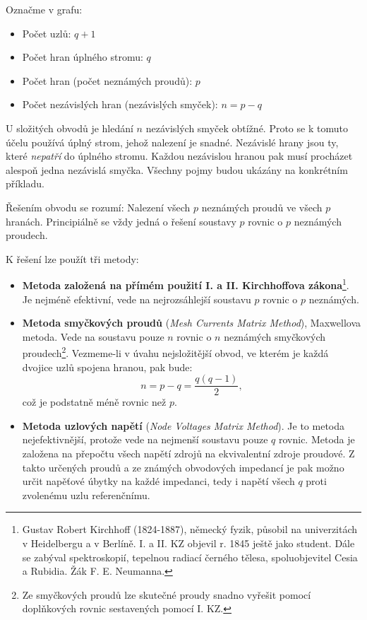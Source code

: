       Označme v grafu:
       \begin{itemize}\addtolength{\itemsep}{-0.5\baselineskip}
         \item Počet uzlů:  \(q +1\)
      \item Počet hran úplného stromu:  \(q\)
      \item Počet hran (počet neznámých proudů):  \(p\)
      \item Počet nezávislých hran (nezávislých smyček):  \(n=p-q\)
      \end{itemize}
      
      U složitých obvodů je hledání \(n\) nezávislých smyček obtížné. Proto se k tomuto účelu 
      používá úplný strom, jehož nalezení je snadné. Nezávislé hrany jsou ty, které \emph{nepatří} 
      do úplného stromu. Každou nezávislou hranou pak musí procházet alespoň jedna nezávislá 
      smyčka. Všechny pojmy budou ukázány na konkrétním příkladu.
      
      Řešením obvodu se rozumí: Nalezení všech \(p\) neznámých proudů ve všech \(p\) hranách.
      Principiálně se vždy jedná o řešení soustavy \(p\) rovnic o \(p\) neznámých proudech.
      
      K řešení lze použít tři metody:
      \begin{itemize}\addtolength{\itemsep}{-0.5\baselineskip}
       \item \textbf{Metoda založená na přímém použití I. a II. Kirchhoffova 
             zákona}\footnote{Gustav Robert Kirchhoff (1824-1887), německý fyzik, působil na 
             univerzitách v Heidelbergu a v Berlíně. I. a II. KZ objevil r. 1845 ještě jako 
             student. Dále se zabýval spektroskopií, tepelnou radiací černého tělesa, 
             spoluobjevitel Cesia a Rubidia. Žák F. E. Neumanna.}.
             Je nejméně efektivní, vede na nejrozsáhlejší soustavu \(p\) rovnic o \(p\) neznámých.
       \item \textbf{Metoda smyčkových proudů} (\emph{Mesh Currents Matrix Method}), Maxwellova 
             metoda. Vede na soustavu pouze \(n\) rovnic o \(n\) neznámých smyčkových 
             proudech\footnote{Ze smyčkových proudů lze skutečné proudy snadno vyřešit pomocí 
             doplňkových rovnic sestavených pomocí I. KZ.}. Vezmeme-li v úvahu nejsložitější obvod, 
             ve kterém je každá dvojice uzlů spojena hranou, pak bude:
             \begin{equation}\label{ES:eq_topol00}
               n=p-q=\frac{q(q-1)}{2},
             \end{equation}
             což je  podstatně méně rovnic než \(p\).
       \item \textbf{Metoda uzlových napětí} (\emph{Node Voltages Matrix Method}). Je to metoda 
             nejefektivnější, protože vede na nejmenší soustavu pouze \(q\) rovnic. Metoda je 
             založena na přepočtu všech napětí zdrojů na ekvivalentní zdroje proudové. Z takto 
             určených proudů a ze známých obvodových impedancí je pak možno určit napěťové úbytky 
             na každé impedanci, tedy i napětí všech \(q\) proti zvolenému uzlu referenčnímu.
      \end{itemize}
      
